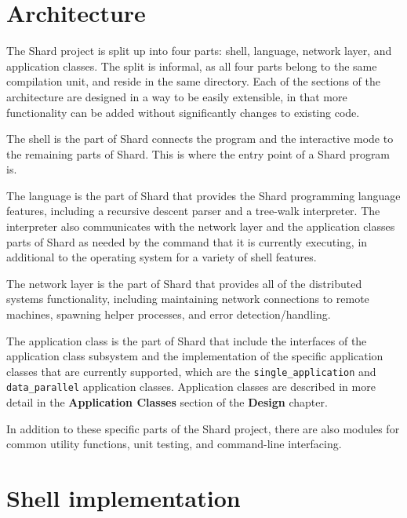 \documentclass[twoside]{report}
\begin{document}
\section{Architecture}


The Shard project is split up into four parts: shell, language, network layer, and application classes. The split is informal, as all four parts belong to the same compilation unit, and reside in the same directory.
Each of the sections of the architecture are designed in a way to be easily extensible, in that more functionality can be added without significantly changes to existing code.

The shell is the part of Shard connects the program and the interactive mode to the remaining parts of Shard. This is where the entry point of a Shard program is.

The language is the part of Shard that provides the Shard programming language features, including a recursive descent parser and a tree-walk interpreter. The interpreter also communicates with the network layer and the application classes parts of Shard as needed by the command that it is currently executing, in additional to the operating system for a variety of shell features.

The network layer is the part of Shard that provides all of the distributed systems functionality, including maintaining network connections to remote machines, spawning helper processes, and error detection/handling.

The application class is the part of Shard that include the interfaces of the application class subsystem and the implementation of the specific application classes that are currently supported, which are the \texttt{single\_application} and \texttt{data\_parallel} application classes. Application classes are described in more detail in the \textbf{Application Classes} section of the \textbf{Design} chapter.

In addition to these specific parts of the Shard project, there are also modules for common utility functions, unit testing, and command-line interfacing.

\section{Shell implementation}
\end{document}
